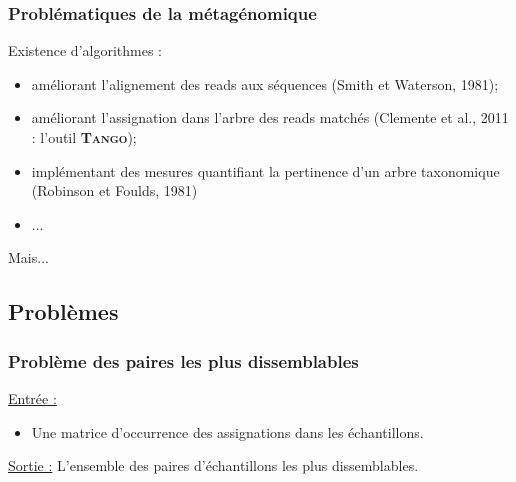 \documentclass{beamer}
\begin{document}
\begin{frame}
\frametitle{Problématiques de la métagénomique}

Existence d'algorithmes :
\begin{itemize}
\item améliorant l'alignement des reads aux séquences (Smith et Waterson, 1981);
\item améliorant l'assignation dans l'arbre des reads matchés (Clemente et al., 2011 : l'outil\textsc{ \bf Tango});
\item implémentant des mesures quantifiant la pertinence d'un arbre taxonomique (Robinson et Foulds, 1981)
\item ...
\end{itemize}

\begin{center}
Mais...
\end{center}



\end{frame}

\subsection{Problèmes}


\begin{frame}
\frametitle{Problème des paires les plus dissemblables}

\uline{Entrée :} \begin{itemize} \item Une matrice d'occurrence des assignations dans les échantillons. \end{itemize}

\bigskip
\uline{Sortie :} L'ensemble des paires d'échantillons les plus dissemblables.

\end{frame}
\end{document}
